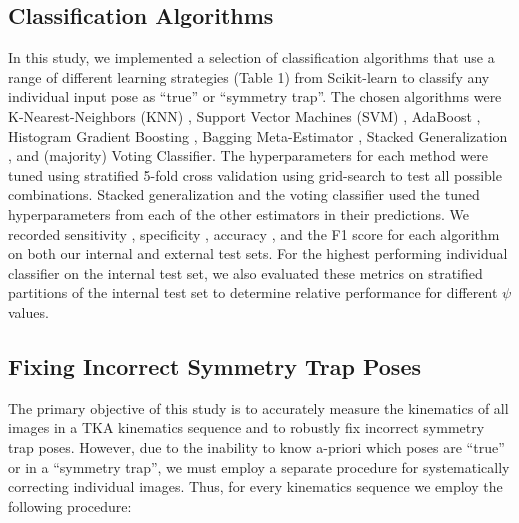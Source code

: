 {\subsection{Classification Algorithms}
In this study, we implemented a selection of classification algorithms that use a range of different learning strategies (Table 1) from Scikit-learn \cite{scikit-learn} to classify any individual input pose as  ``true'' or ``symmetry trap''.
The chosen algorithms were K-Nearest-Neighbors (KNN) \cite{fixDiscriminatoryAnalysisNanparametric1951},
Support Vector Machines (SVM) \cite{cortesSupportvectorNetworks1995}, AdaBoost \cite{friedmanGreedyFunctionApproximation2001},
Histogram Gradient Boosting \cite{freundDecisionTheoreticGeneralizationOnLine1997},
Bagging Meta-Estimator \cite{breimanBaggingPredictors1996},
Stacked Generalization \cite{smythLinearlyCombiningDensity1999,wolpertStackedGeneralization1992},
and (majority) Voting Classifier.
The hyperparameters for each method were tuned using stratified 5-fold cross validation using grid-search to test all possible combinations.
Stacked generalization and the voting classifier used the tuned hyperparameters from each of the other estimators in their predictions.
We recorded sensitivity \cite{yerushalmyStatisticalProblemsAssessing1947}, specificity \cite{yerushalmyStatisticalProblemsAssessing1947}, accuracy \cite{internationalorganizationforstandardizationAccuracyTruenessPrecision2023},
and the F1 score \cite{tahaMetricsEvaluating3D2015} for each algorithm on both our internal and external test sets.
For the highest performing individual classifier on the internal test set, we also evaluated these metrics on stratified partitions of the internal test set to determine relative performance for different $\psi$ values.


\subsection{Fixing Incorrect Symmetry Trap Poses}
The primary objective of this study is to accurately measure the kinematics of all images in a TKA kinematics sequence and to robustly fix incorrect symmetry trap poses.
However, due to the inability to know a-priori which poses are “true” or in a “symmetry trap”, we must employ a separate procedure for systematically correcting individual images.
Thus, for every kinematics sequence we employ the following procedure:

}
